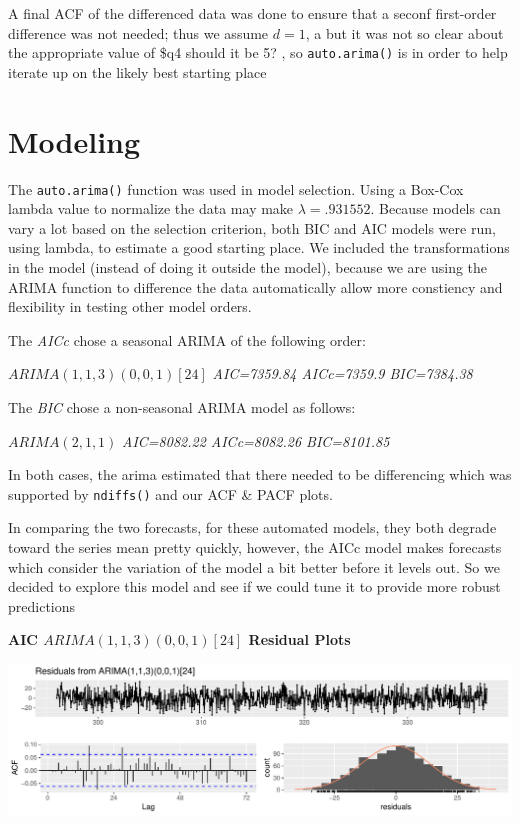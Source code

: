 \documentclass[openany]{book}
\begin{document}
A final ACF of the differenced data was done to ensure that a seconf
first-order difference was not needed; thus we assume \(d = 1\), a but
it was not so clear about the appropriate value of \$q4 should it be 5?
, so \texttt{auto.arima()} is in order to help iterate up on the likely
best starting place

\hypertarget{modeling-2}{%
\section{Modeling}\label{modeling-2}}

The \texttt{auto.arima()} function was used in model selection. Using a
Box-Cox lambda value to normalize the data may make
\(\lambda= .931552\). Because models can vary a lot based on the
selection criterion, both BIC and AIC models were run, using lambda, to
estimate a good starting place. We included the transformations in the
model (instead of doing it outside the model), because we are using the
ARIMA function to difference the data automatically allow more
constiency and flexibility in testing other model orders.

The \emph{AICc} chose a seasonal ARIMA of the following order:

\(ARIMA(1,1,3)(0,0,1)[24]\) \emph{AIC=7359.84 AICc=7359.9 BIC=7384.38}

The \emph{BIC} chose a non-seasonal ARIMA model as follows:

\(ARIMA(2,1,1)\) \emph{AIC=8082.22 AICc=8082.26 BIC=8101.85}

In both cases, the arima estimated that there needed to be differencing
which was supported by \texttt{ndiffs()} and our ACF \& PACF plots.

In comparing the two forecasts, for these automated models, they both
degrade toward the series mean pretty quickly, however, the AICc model
makes forecasts which consider the variation of the model a bit better
before it levels out. So we decided to explore this model and see if we
could tune it to provide more robust predictions

\textbf{AIC \(ARIMA(1,1,3)(0,0,1)[24]\) Residual Plots}

\includegraphics{Group2_Project1_Fall2019_files/figure-latex/unnamed-chunk-22-1.pdf}
\end{document}
